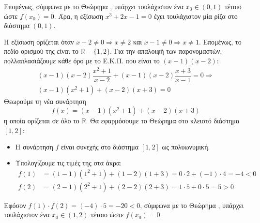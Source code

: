 Επομένως, σύμφωνα με το Θεώρημα , υπάρχει τουλάχιστον ένα $x_0 \in (0, 1)$ τέτοιο ώστε $f(x_0) = 0$.
Άρα, η εξίσωση $x^3 + 2x - 1 = 0$ έχει τουλάχιστον μία ρίζα στο διάστημα $(0, 1)$.\\


\lysh
Η εξίσωση ορίζεται όταν $x-2 \neq 0 \Rightarrow x \neq 2$ και $x-1 \neq 0 \Rightarrow x \neq 1$.
Επομένως, το πεδίο ορισμού της είναι το $\mathbb{R} - \{1, 2\}$.
Για την απαλοιφή των παρονομαστών, πολλαπλασιάζουμε κάθε όρο με το Ε.Κ.Π. που είναι το $(x-1)(x-2)$:
\begin{gather*}
(x-1)(x-2) \dfrac{x^2+1}{x-2} + (x-1)(x-2) \dfrac{x+3}{x-1} = 0 \Rightarrow \\
(x-1)(x^2+1) + (x-2)(x+3) = 0
\end{gather*}
Θεωρούμε τη νέα συνάρτηση 
\[ f(x) = (x-1)(x^2+1) + (x-2)(x+3) \]
η οποία ορίζεται σε όλο το $\mathbb{R}$. Θα εφαρμόσουμε το Θεώρημα  στο κλειστό διάστημα $[1, 2]$:
\begin{itemize}
    \item Η συνάρτηση $f$ είναι συνεχής στο διάστημα $[1, 2]$ ως πολυωνυμική.
    \item Υπολογίζουμε τις τιμές της στα άκρα:
    \begin{align*}
        f(1) &= (1-1)(1^2+1) + (1-2)(1+3) = 0 \cdot 2 + (-1) \cdot 4 = -4 < 0 \\
        f(2) &= (2-1)(2^2+1) + (2-2)(2+3) = 1 \cdot 5 + 0 \cdot 5 = 5 > 0
    \end{align*}
\end{itemize}
Εφόσον $f(1) \cdot f(2) = (-4) \cdot 5 = -20 < 0$, σύμφωνα με το Θεώρημα , υπάρχει τουλάχιστον ένα $x_0 \in (1, 2)$ τέτοιο ώστε $f(x_0) = 0$.\\


